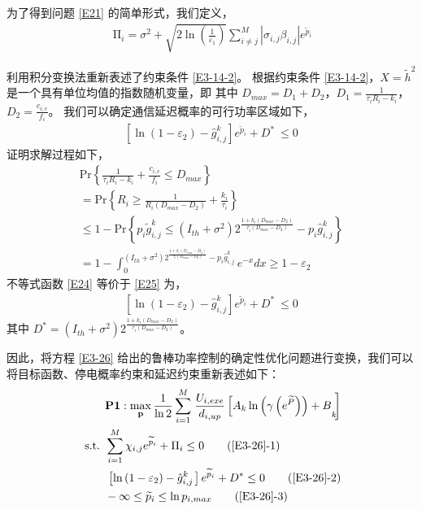 为了得到问题 \eqref{E21} 的简单形式，我们定义，
\begin{eqnarray}\label{E22}
\ \mathrm{\Pi}_i=\sigma^2+\sqrt{2\ln\left(\frac{1}{\varepsilon_1}\right)}\sum_{i\neq j}^{M}{\left|\sigma_{i,j}\beta_{i,j}\right|e^{{\widetilde{p}}_i}}
\end{eqnarray}

利用积分变换法重新表述了约束条件 \eqref{E3-14-2}。 根据约束条件 \eqref{E3-14-2}，$X={\widetilde{h}}^2$ 是一个具有单位均值的指数随机变量，即 其中 $D_{max}=D_1+D_2 $，$D_1=\frac{1}{\tau_iR_i-k_i} $，$D_2=\frac{c_{i,e}}{f_i} $。 我们可以确定通信延迟概率的可行功率区域如下，
\begin{eqnarray}\label{E23}
\left.\left[\ln\left(1-\varepsilon_2\right)-{\hat{g}}_{i,j}^k\right.\right]e^{{\widetilde{p}}_i}+D^\ast\ \le0
\end{eqnarray}
证明求解过程如下，
\begin{equation}\label{E24}
\begin{array}{ll}
\textrm{Pr}\left\{\frac{1}{\tau_iR_i-k_i}+\frac{c_{i,e}}{f_i}\le D_{max}\right\}\\
=\textrm{Pr}\left\{R_i\geq\frac{1}{R_i\left(D_{max}-D_2\right)}+\frac{k_i}{\tau_i}\right\}\\
\!\le1\!-\!\textrm{Pr}\left\{p_i{\widetilde{g}}_{i,j}^k\le\left(I_{th}+\sigma^2\right)2^\frac{1+k_i\left(D_{max}-D_2\right)}{\tau_i\left(D_{max}-D_2\right)}-p_i{\hat{g}}_{i,j}^k\right\}\\
=\!1\!-\!\int_{0}^{\left(I_{th}+\sigma^2\right)2^\frac{1+k_i\left(D_{max}-D_2\right)}{\tau_i\left(D_{max}-D_2\right)}-p_i{\hat{g}}_{i,j}^k}{e^{-x}dx}\!\geq\!1-\varepsilon_2
\end{array}
\end{equation}
不等式函数 \eqref{E24} 等价于 \eqref{E25} 为，
\begin{eqnarray}\label{E25}
\left.\left[\ln\left(1-\varepsilon_2\right)-{\hat{g}}_{i,j}^k\right.\right]e^{{\widetilde{p}}_i}+D^\ast\ \le0
\end{eqnarray}
其中 $D^\ast=\left(I_{th}+\sigma^2\right)2^\frac{1+k_i\left(D_{max}-D_2\right)}{\tau_i\left(D_{max}-D_2\right)}$。

因此，将方程 \eqref{E3-26} 给出的鲁棒功率控制的确定性优化问题进行变换，我们可以将目标函数、停电概率约束和延迟约束重新表述如下：
\begin{align}
&\textbf{P1}:\max\limits_{\mathbf{p}}\frac{1}{\ln{2}}\sum_{i=1}^{M}\left.\frac{U_{i,exe}}{d_{i,up}}
\left[{A_k\ln{\left(\gamma\left(e^{\widetilde{P}}\right)\right)}+B}_k\!\!\right.\right]                         \label{E3-26}\\
\text { s.t. }
& \sum_{i=1}^{M}{\chi_{i,j}e^{{\widetilde{p}}_i}}+\mathrm{\Pi}_i\le0                                           \tag{\ref{E3-26}{-1}}      \label{E3-26-1}\\  %
& \left.\left[\ln\left(1-\varepsilon_2\right)-{\hat{g}}_{i,j}^k\right.\right]e^{{\widetilde{p}}_i}+D^\ast\le0  \tag{\ref{E3-26}{-2}}      \label{E3-26-2}\\  %
& -\infty\le{\widetilde{p}}_i\le \ln{p_{i,max}}                                                                \tag{\ref{E3-26}{-3}}      \label{E3-26-3}  %
\end{align}
